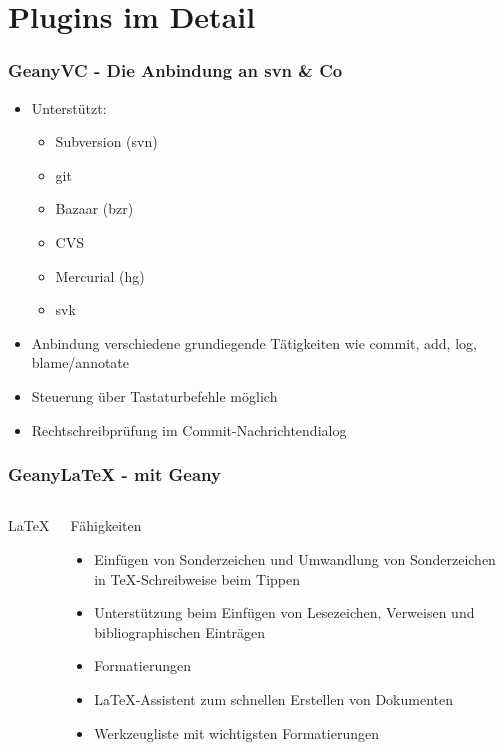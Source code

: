 \section{Plugins im Detail}
\begin{frame}
  \frametitle{GeanyVC - Die Anbindung an svn \& Co}
  \begin{block}{}
    \begin{itemize}
    \item Unterstützt:
      \begin{itemize}
      \item Subversion (svn)
      \item git
      \item Bazaar (bzr)
      \item CVS
      \item Mercurial (hg)
      \item svk
      \end{itemize}
    \item Anbindung verschiedene grundiegende Tätigkeiten wie commit,
      add, log, blame/annotate
    \item Steuerung über Tastaturbefehle möglich
    \item Rechtschreibprüfung im Commit-Nachrichtendialog
    \end{itemize}
  \end{block}
\end{frame}

\begin{frame}
  \frametitle{GeanyLaTeX - \LaTeXe mit Geany}
  \begin{columns}[c]
    \column[c]{2cm} \huge \LaTeX \column{8cm}
    \begin{block}{Fähigkeiten}
      \begin{itemize}
      \item Einfügen von Sonderzeichen und Umwandlung von
        Sonderzeichen in \TeX-Schreibweise beim Tippen
      \item Unterstützung beim Einfügen von Lesezeichen, Verweisen und
        bibliographischen Einträgen
      \item Formatierungen
      \item \LaTeX-Assistent zum schnellen Erstellen von Dokumenten
      \item Werkzeugliste mit wichtigsten Formatierungen
      \end{itemize}
    \end{block}
  \end{columns}
\end{frame}

